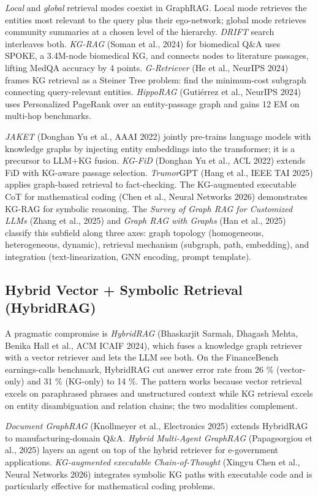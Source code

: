 \emph{Local} and \emph{global} retrieval modes coexist in GraphRAG. Local mode retrieves the entities most relevant to the query plus their ego-network; global mode retrieves community summaries at a chosen level of the hierarchy. \emph{DRIFT} search interleaves both. \emph{KG-RAG} (Soman et al., 2024) for biomedical Q\&A uses SPOKE, a 3.4M-node biomedical KG, and connects nodes to literature passages, lifting MedQA accuracy by 4 points. \emph{G-Retriever} (He et al., NeurIPS 2024) frames KG retrieval as a Steiner Tree problem: find the minimum-cost subgraph connecting query-relevant entities. \emph{HippoRAG} (Gutiérrez et al., NeurIPS 2024) uses Personalized PageRank over an entity-passage graph and gains 12 EM on multi-hop benchmarks.

\emph{JAKET} (Donghan Yu et al., AAAI 2022) jointly pre-trains language models with knowledge graphs by injecting entity embeddings into the transformer; it is a precursor to LLM+KG fusion. \emph{KG-FiD} (Donghan Yu et al., ACL 2022) extends FiD with KG-aware passage selection. \emph{Trumor}GPT (Hang et al., IEEE TAI 2025) applies graph-based retrieval to fact-checking. The KG-augmented executable CoT for mathematical coding (Chen et al., Neural Networks 2026) demonstrates KG-RAG for symbolic reasoning. The \emph{Survey of Graph RAG for Customized LLMs} (Zhang et al., 2025) and \emph{Graph RAG with Graphs} (Han et al., 2025) classify this subfield along three axes: graph topology (homogeneous, heterogeneous, dynamic), retrieval mechanism (subgraph, path, embedding), and integration (text-linearization, GNN encoding, prompt template).

\subsection{Hybrid Vector + Symbolic Retrieval (HybridRAG)}\label{hybrid-vector-symbolic-retrieval-hybridrag}

A pragmatic compromise is \emph{HybridRAG} (Bhaskarjit Sarmah, Dhagash Mehta, Benika Hall et al., ACM ICAIF 2024), which fuses a knowledge graph retriever with a vector retriever and lets the LLM see both. On the FinanceBench earnings-calls benchmark, HybridRAG cut answer error rate from 26 \% (vector-only) and 31 \% (KG-only) to 14 \%. The pattern works because vector retrieval excels on paraphrased phrases and unstructured context while KG retrieval excels on entity disambiguation and relation chains; the two modalities complement.

\emph{Document GraphRAG} (Knollmeyer et al., Electronics 2025) extends HybridRAG to manufacturing-domain Q\&A. \emph{Hybrid Multi-Agent GraphRAG} (Papageorgiou et al., 2025) layers an agent on top of the hybrid retriever for e-government applications. \emph{KG-augmented executable Chain-of-Thought} (Xingyu Chen et al., Neural Networks 2026) integrates symbolic KG paths with executable code and is particularly effective for mathematical coding problems.

